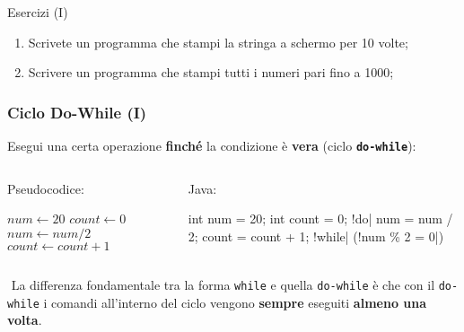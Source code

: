 \begin{frame}{Esercizi (I)}
  \begin{enumerate}
   \item Scrivete un programma che stampi la stringa \texttt{} a schermo per 10 volte;
   \item Scrivere un programma che stampi tutti i numeri pari fino a 1000;
  \end{enumerate}
\end{frame}

\begin{frame}[fragile]\frametitle{Ciclo Do-While (I)}
  Esegui una certa operazione \textbf{finché} la condizione è \textbf{vera} (ciclo \textbf{\texttt{do-while}}):
  \begin{columns}[T]
    \begin{column}[T]{5cm}
      Pseudocodice:
      \begin{algorithmic}[1]     
	\State $num \gets 20$
	\State $count \gets 0$
	\Do
	  \State $num \gets num / 2$
	  \State $count \gets count + 1$
      \end{algorithmic}
    \end{column}
    \begin{column}[T]{5cm}
      Java:
      \begin{JavaCodePlain}[commandchars=\\!|]
	int num = 20;
	int count = 0;
	\Word!do| {
	  num = num / 2;
	  count = count + 1;
	} \Word!while| (\Green!num \% 2 \bang= 0|)
      \end{JavaCodePlain}
    \end{column}
  \end{columns}
  ${}$\newline
  La differenza fondamentale tra la forma \texttt{while} e quella \texttt{do-while} 
  è che con il \texttt{do-while} i comandi all'interno del ciclo vengono 
  \textbf{sempre} eseguiti \textbf{almeno una volta}.
\end{frame}

